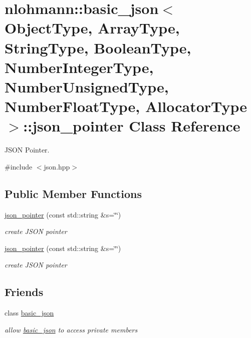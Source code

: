 \hypertarget{classnlohmann_1_1basic__json_1_1json__pointer}{\section{nlohmann\-:\-:basic\-\_\-json$<$ Object\-Type, Array\-Type, String\-Type, Boolean\-Type, Number\-Integer\-Type, Number\-Unsigned\-Type, Number\-Float\-Type, Allocator\-Type $>$\-:\-:json\-\_\-pointer Class Reference}
\label{classnlohmann_1_1basic__json_1_1json__pointer}
}


J\-S\-O\-N Pointer.  




{\ttfamily \#include $<$json.\-hpp$>$}

\subsection*{Public Member Functions}
\begin{DoxyCompactItemize}
\item 
\hyperlink{classnlohmann_1_1basic__json_1_1json__pointer_ae12db117a2742d826465080979d7c835}{json\-\_\-pointer} (const std\-::string \&s=\char`\"{}\char`\"{})
\begin{DoxyCompactList}\small\item\em create J\-S\-O\-N pointer \end{DoxyCompactList}\item 
\hyperlink{classnlohmann_1_1basic__json_1_1json__pointer_ae12db117a2742d826465080979d7c835}{json\-\_\-pointer} (const std\-::string \&s=\char`\"{}\char`\"{})
\begin{DoxyCompactList}\small\item\em create J\-S\-O\-N pointer \end{DoxyCompactList}\end{DoxyCompactItemize}
\subsection*{Friends}
\begin{DoxyCompactItemize}
\item 
class \hyperlink{classnlohmann_1_1basic__json_1_1json__pointer_a069a4f73a702f4c2bc0d14ca1565a7b0}{basic\-\_\-json}
\begin{DoxyCompactList}\small\item\em allow \hyperlink{classnlohmann_1_1basic__json}{basic\-\_\-json} to access private members \end{DoxyCompactList}\end{DoxyCompactItemize}


